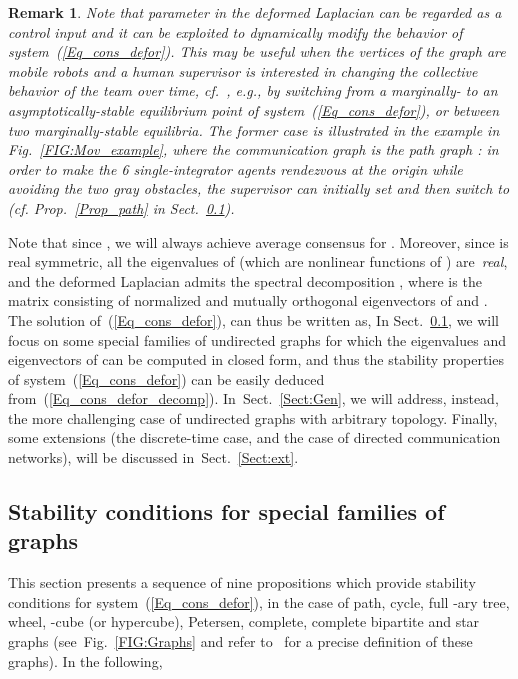 \documentclass[letterpaper,9pt,twocolumn]{autart}
\newtheorem{remark}{\textbf{Remark}}
\begin{document}
\begin{remark}
Note that parameter  in the deformed Laplacian
 can be regarded as a
control input and it can be exploited to \emph{dynamically} modify the behavior of system~(\ref{Eq_cons_defor}). This may be useful when the
vertices of the graph are mobile robots and a human supervisor
is interested in changing the collective behavior of the team over
time, cf.~\cite{MilutinovicLi_TRO06}, 
e.g., by switching from a marginally- to an asymptotically-stable
equilibrium point of system~(\ref{Eq_cons_defor}), or between two marginally-stable
equilibria. The former case is illustrated in the example in
Fig.~\ref{FIG:Mov_example}, where the communication graph is the path
graph : in order to make the 6 single-integrator agents
rendezvous at the origin while avoiding the
two gray obstacles, the supervisor can initially set  and then
switch to  (cf. Prop.~\ref{Prop_path} in Sect.~\ref{Sect:Spec}).~\hfill
\end{remark} 



Note that since , we will always achieve
average consensus for . Moreover, since  is real symmetric,
all the eigenvalues of  (which are nonlinear functions of )
are~\emph{real}, and the deformed Laplacian admits
the spectral decomposition ,
where   is the matrix
consisting of normalized and mutually orthogonal eigenvectors of
 and 
.
The solution of~(\ref{Eq_cons_defor}), can thus be written as, 
In Sect.~\ref{Sect:Spec}, we will focus on some special families of undirected graphs for
which the eigenvalues and eigenvectors of  can be
computed in closed form, and thus the stability properties of system~(\ref{Eq_cons_defor})
can be easily deduced from~(\ref{Eq_cons_defor_decomp}).
In~Sect.~\ref{Sect:Gen}, we will address, instead, the more challenging case
of undirected graphs with arbitrary topology. Finally, some extensions
(the discrete-time case, and the case of directed communication networks), will be discussed in~Sect.~\ref{Sect:ext}. 

\subsection{Stability conditions for special families of graphs}\label{Sect:Spec}

This section presents a sequence of nine propositions which provide stability conditions
for system~(\ref{Eq_cons_defor}), in the case of path, cycle, full -ary tree, wheel, -cube (or hypercube), Petersen, complete, complete bipartite and star graphs
(see~Fig.~\ref{FIG:Graphs} and refer to~\cite{GodsilRo_book01} for a precise definition of these graphs).
In the following, 
 
\end{document}
